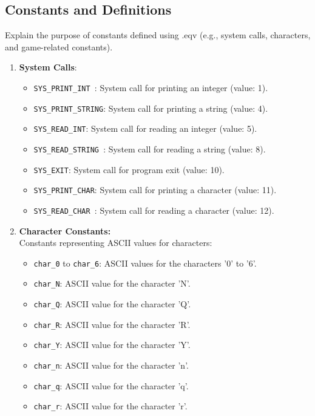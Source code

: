 \subsection{Constants and Definitions}
Explain the purpose of constants defined using .eqv (e.g., system calls, characters, and game-related constants).

\begin{enumerate}
    \item \textbf{System Calls}:
    \begin{itemize}
        \item \texttt{SYS\_PRINT\_INT  \quad}: System call for printing an integer (value: 1).
        \item \texttt{SYS\_PRINT\_STRING}: System call for printing a string (value: 4).
        \item \texttt{SYS\_READ\_INT\qquad}: System call for reading an integer (value: 5).
        \item \texttt{SYS\_READ\_STRING }: System call for reading a string (value: 8).
        \item \texttt{SYS\_EXIT\qquad\qquad}: System call for program exit (value: 10).
        \item \texttt{SYS\_PRINT\_CHAR\quad}: System call for printing a character (value: 11).
        \item \texttt{SYS\_READ\_CHAR   \quad}: System call for reading a character (value: 12).
    \end{itemize}
    \item \textbf{Character Constants:} \\
    Constants representing ASCII values for characters:
    \begin{itemize}
        \item \texttt{char\_0} to \texttt{char\_6}: ASCII values for the characters '0' to '6'.
        \item \texttt{char\_N}: ASCII value for the character 'N'.
        \item \texttt{char\_Q}: ASCII value for the character 'Q'.
        \item \texttt{char\_R}: ASCII value for the character 'R'.
        \item \texttt{char\_Y}: ASCII value for the character 'Y'.
        \item \texttt{char\_n}: ASCII value for the character 'n'.
        \item \texttt{char\_q}: ASCII value for the character 'q'.
        \item \texttt{char\_r}: ASCII value for the character 'r'.

\end{itemize}
\end{enumerate}
